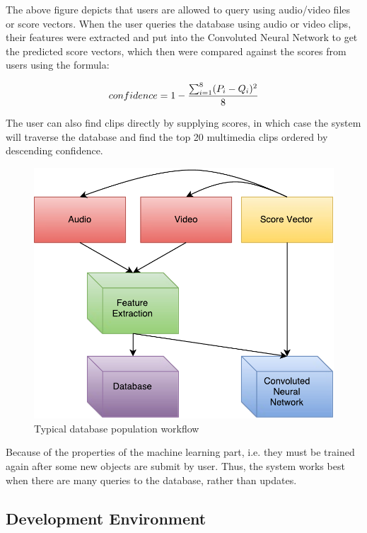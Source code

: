 \documentclass{report}
\begin{document}
The above figure depicts that users are allowed to query using audio/video files or score vectors. When the user queries the database using audio or video clips, their features were extracted and put into the Convoluted Neural Network to get the predicted score vectors, which then were compared against the scores from users using the formula:

\begin{equation}
\label{eq:confidence}
confidence = 1 - {\sum_{i=1}^{8} (P_i - Q_i)^2 \over 8}
\end{equation}

The user can also find clips directly by supplying scores, in which case the system will traverse the database and find the top 20 multimedia clips ordered by descending confidence.

\begin{figure}[H]
  \centering
  \includegraphics[scale=0.7]{vdf-pop.pdf}
  \caption{Typical database population workflow}
  \label{fig:pwf}
\end{figure}

Because of the properties of the machine learning part, i.e. they must be trained again after some new objects are submit by user. Thus, the system works best when there are many queries to the database, rather than updates.

\subsection{Development Environment}
\end{document}

